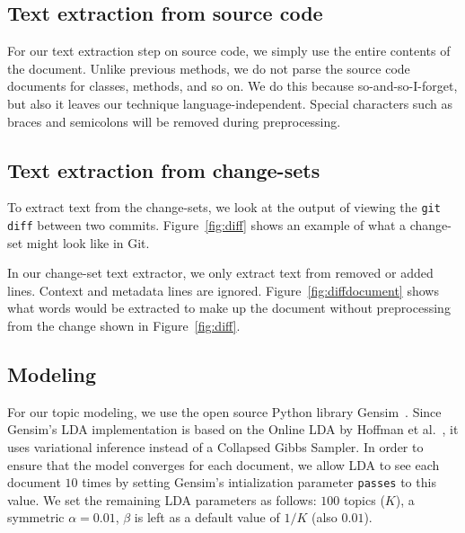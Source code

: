 \subsection{Text extraction from source code}

For our text extraction step on source code,
we simply use the entire contents of the document.
Unlike previous methods\needcite,
we do not parse the source code documents for classes, methods, and so on.
We do this because so-and-so-I-forget\needcite,
but also it leaves our technique language-independent.
Special characters such as braces and semicolons will be removed during
preprocessing.

\subsection{Text extraction from change-sets}


To extract text from the change-sets, we look at the output of viewing
the \texttt{git diff} between two commits.
Figure~\ref{fig:diff} shows an example of what a change-set might look
like in Git.

In our change-set text extractor, we only extract text from removed or added lines.
Context and metadata lines are ignored.
Figure~\ref{fig:diffdocument} shows what words would be extracted to make up the document without preprocessing
from the change shown in Figure~\ref{fig:diff}.

\subsection{Modeling}

For our topic modeling, we use the open source Python library Gensim~\cite{Gensim}.
Since Gensim's LDA implementation is based on the
Online LDA by Hoffman et al.~\cite{Hoffman-etal:2010},
it uses variational inference instead of a Collapsed Gibbs Sampler.
In order to ensure that the model converges for each document,
we allow LDA to see each document $10$ times by setting
Gensim's intialization parameter \texttt{passes} to this value.
We set the remaining LDA parameters as follows:
$100$ topics ($K$),
a symmetric $\alpha=0.01$,
$\beta$ is left as a default value of $1/K$ (also $0.01$).
